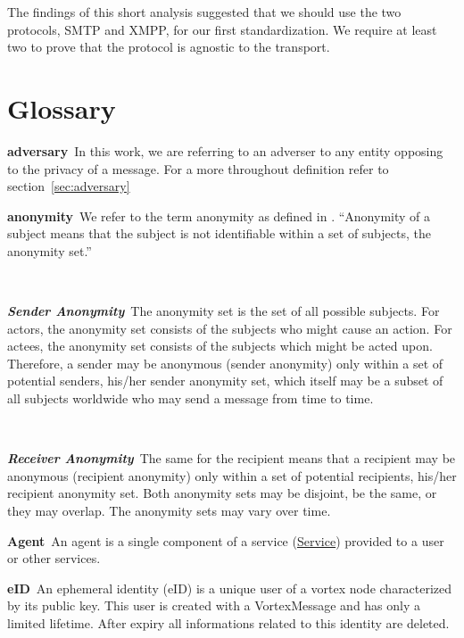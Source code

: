 \documentclass[a4paper,appendixprefix,pdfusetitle,twocolumn,fontsize=8pt,draft,DIV=calc,8pt]{\doctype} %
\newenvironment{entry}{\par\leavevmode\hangpara{1.5mm}{1}\ignorespaces}{\RaggedRight\par}
\newcommand*{\mainentry}[2]{{\bfseries{#1\label{def:#1}}}~#2\par}
\newcommand*{\subentry}[2]{\par~\begin{minipage}{\columnwidth-0.6cm}{\bfseries{\itshape{#1\label{def:#1}}}}~#2\end{minipage}}
\newcommand*{\defref}[1]{\hyperref[def:#1]{#1}}
\begin{document}
The findings of this short analysis suggested that we should use the two protocols, SMTP and XMPP, for our first standardization. We require at least two to prove that the protocol is agnostic to the transport.

\clearpage\chapter{Glossary}

\begin{entry}
	\mainentry{adversary}{In this work, we are referring to an adverser to any entity opposing to the privacy of a message. For a more throughout definition refer to section~\ref{sec:adversary}}
\end{entry}

\begin{entry}
	\mainentry{anonymity}{We refer to the term anonymity as defined in \cite{anonTerminology}. ``Anonymity of a subject means that the subject is not identifiable within a set of subjects, the anonymity set.''\omitted}
	\subentry{Sender Anonymity}{The anonymity set is the set of all possible subjects. For actors, the anonymity set consists of the subjects who might cause an action. For actees, the anonymity set consists of the subjects which might be acted upon. Therefore, a sender may be anonymous (sender anonymity) only within a set of potential senders, his/her sender anonymity set, which itself may be a subset of all subjects worldwide who may send a message from time to time.}
	\subentry{Receiver Anonymity}{The same for the recipient means that a recipient may be anonymous (recipient anonymity) only within a set of potential recipients, his/her recipient anonymity set. Both anonymity sets may be disjoint, be the same, or they may overlap. The anonymity sets may vary over time.}
\end{entry}

\begin{entry}
	\mainentry{Agent}{An agent is a single component of a service (\defref{Service}) provided to a user or other services.}
\end{entry}

\begin{entry}
	\mainentry{eID}{An ephemeral identity (eID) is a unique user of a vortex node characterized by its public key. This user is created with a VortexMessage and has only a limited lifetime. After expiry all informations related to this identity are deleted.}
\end{entry}
\end{document}
